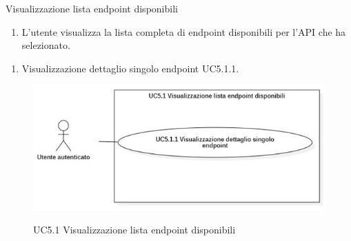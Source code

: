 \begin{usecase}{5.1}{Visualizzazione lista endpoint disponibili}\label{uc:visualizzazione-lista-endpoint-disponibili}

    \usecasemain{}
        \begin{enumerate}
            \item L'utente visualizza la lista completa di endpoint disponibili per l'API che ha selezionato.
        \end{enumerate}

        \begin{enumerate}
            \item Visualizzazione dettaglio singolo endpoint UC5.1.1.
        \end{enumerate}

\end{usecase}

\begin{figure}[!ht] 
    \centering 
    \includegraphics[width=\columnwidth, alt={Caso d'uso relativo al visualizzazione della lista di endpoint disponibili}]{images/usecase/UC5.1.jpg}
    \caption{UC5.1 Visualizzazione lista endpoint disponibili}\label{fig:uc:visualizzazione-lista-endpoint-disponibili}
  \end{figure}
  \pagebreak


